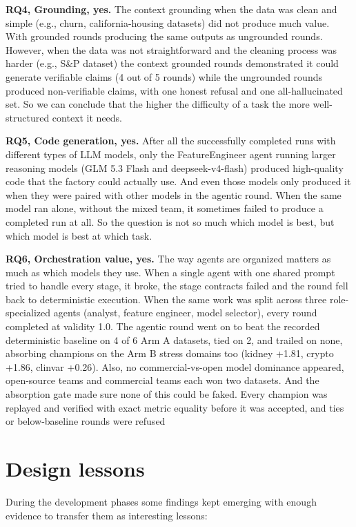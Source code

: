 \textbf{RQ4, Grounding, yes.} The context grounding when the data was clean and simple (e.g., churn, california-housing datasets) did not produce much value. With grounded rounds producing the same outputs as ungrounded rounds. However, when the data was not straightforward and the cleaning process was harder (e.g., S\&P dataset) the context grounded rounds demonstrated it could generate verifiable claims (4 out of 5 rounds) while the ungrounded rounds produced non-verifiable claims, with one honest refusal and one all-hallucinated set. So we can conclude that the higher the difficulty of a task the more well-structured context it needs.

\newpage
\textbf{RQ5, Code generation, yes.} After all the successfully completed
runs with different types of LLM models, only the FeatureEngineer agent
running larger reasoning models (GLM 5.3 Flash and deepseek-v4-flash)
produced high-quality code that the factory could actually use. And even
those models only produced it when they were paired with other models in
the agentic round. When the same model ran alone, without the mixed team,
it sometimes failed to produce a completed run at all. So the question is not so much which model is best, but which model is best at which task.


\textbf{RQ6, Orchestration value, yes.} The way agents are organized matters
as much as which models they use. When a single agent with one shared prompt
tried to handle every stage, it broke, the stage contracts failed and the
round fell back to deterministic execution. When the same work was split
across three role-specialized agents (analyst, feature engineer, model
selector), every round completed at validity 1.0. The agentic round went on
to beat the recorded deterministic baseline on 4 of 6 Arm A datasets, tied
on 2, and trailed on none, absorbing champions on the Arm B stress domains
too (kidney +1.81, crypto +1.86, clinvar +0.26). Also, no commercial-vs-open model
dominance appeared, open-source teams and commercial teams each won two
datasets. And the absorption gate made sure none of this could be faked.
Every champion was replayed and verified with exact metric equality before it was
accepted, and ties or below-baseline rounds were refused

\section{Design lessons}
\label{sec:lessons}

During the development phases some findings kept emerging with enough evidence to transfer them as interesting lessons:


